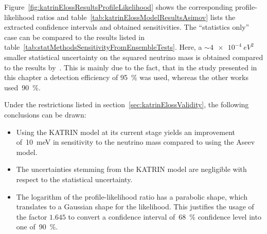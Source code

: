Figure~\ref{fig:katrinElossResultsProfileLikelihood} shows the corresponding profile-likelihood ratios and table~\ref{tab:katrinElossModelResultsAsimov} lists the extracted confidence intervals and obtained sensitivities. The ``statistics only'' case can be compared to the results listed in table~\ref{tab:statMethodsSensitivityFromEnsembleTests}. Here, a $\sim\SI{4e-4}{eV^2}$ smaller statistical uncertainty on the squared neutrino mass is obtained compared to the results by~\cite{Kleesiek2014, Hoetzel2012}. This is mainly due to the fact, that in the study presented in this chapter a detection efficiency of \SI{95}{\percent} was used, whereas the other works used~\SI{90}{\percent}.

Under the restrictions listed in section~\ref{sec:katrinElossValidity}, the following conclusions can be drawn:
\begin{itemize}
	\item Using the KATRIN model at its current stage yields an improvement of~\SI{10}{meV}  in sensitivity to the neutrino mass compared to using the Aseev model.
	\item The uncertainties stemming from the KATRIN model are negligible with respect to the statistical uncertainty.
	\item The logarithm of the profile-likelihood ratio has a parabolic shape, which translates to a Gaussian shape for the likelihood. This justifies the usage of the factor $1.645$ to convert a confidence interval of~\SI{68}{\percent} confidence level into one of~\SI{90}{\percent}.
\end{itemize}


